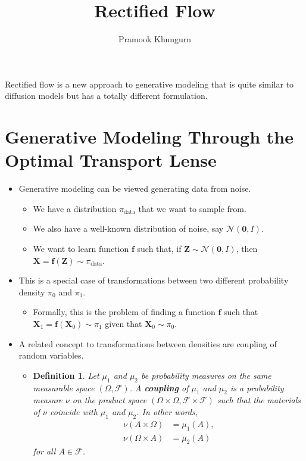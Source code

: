 \documentclass[10pt]{article}
\title{Rectified Flow}
\author{Pramook Khungurn}
\newtheorem{definition}[lemma]{Definition}
\newcommand{\ve}[1]{\mathbf{#1}}
\newcommand{\mcal}[1]{\mathcal{#1}}
\newcommand{\data}{\mathrm{data}}
\begin{document}
\maketitle

Rectified flow \cite{Liu:2022:RectifiedFlow} is a new approach to generative modeling that is quite similar to diffusion models \cite{Ho:2020} but has a totally different formulation.

\section{Generative Modeling Through the Optimal Transport Lense}

\begin{itemize}
  \item Generative modeling can be viewed generating data from noise.
  \begin{itemize}
    \item We have a distribution $\pi_{\data}$ that we want to sample from.
    \item We also have a well-known distribution of noise, say $\mcal{N}(\ve{0},I)$.
    \item We want to learn function $\ve{f}$ such that, if $\ve{Z} \sim \mcal{N}(\ve{0},I)$, then $\ve{X} = \ve{f}(\ve{Z}) \sim \pi_{\data}$.
  \end{itemize}

  \item This is a special case of transformations between two different probability density $\pi_0$ and $\pi_1$.
  \begin{itemize}
    \item Formally, this is the problem of finding a function $\ve{f}$ such that \\ $\ve{X}_1 = \ve{f}(\ve{X}_0) \sim \pi_1$ given that $\ve{X}_0 \sim \pi_0$.
  \end{itemize}
  
  \item A related concept to transformations between densities are coupling of random variables.
  \begin{itemize}
    \item \begin{definition}
      Let $\mu_1$ and $\mu_2$ be probability measures on the same measurable space $(\Omega, \mcal{F})$. A {\bf coupling} of $\mu_1$ and $\mu_2$ is a probability measure $\nu$ on the product space $(\Omega \times \Omega, \mcal{F} \times \mcal{F})$ such that the materials of $\nu$ coincide with $\mu_1$ and $\mu_2$. In other words,
      \begin{align*}
        \nu(A \times \Omega) &= \mu_1(A), \\
        \nu(\Omega \times A) &= \mu_2(A)
      \end{align*}
      for all $A \in \mcal{F}$.
    \end{definition}


\end{itemize}
\end{itemize}
\end{document}
